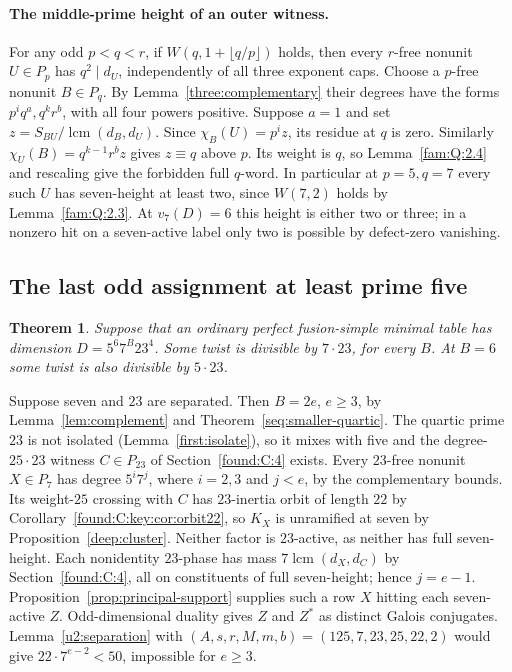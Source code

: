 \documentclass[11pt,a4paper]{article}
\numberwithin{equation}{section}
\newtheorem{theorem}{Theorem}[section]
\theoremstyle{remark}
\begin{document}
\paragraph{The middle-prime height of an outer witness.}
For any odd $p<q<r$, if $W(q,1+\lfloor q/p\rfloor)$ holds, then
every $r$-free nonunit $U\in P_p$ has $q^2\mid d_U$, independently
of all three exponent caps. Choose a $p$-free nonunit $B\in P_q$.
By Lemma~\ref{three:complementary} their degrees have the forms $p^i q^a,q^k r^b$,
with all four powers positive. Suppose $a=1$ and set
$z=S_{BU}/\operatorname{lcm}(d_B,d_U)$. Since
$\chi_B(U)=p^i z$, its residue at $q$ is zero. Similarly
$\chi_U(B)=q^{k-1}r^b z$ gives $z\equiv q$ above $p$.
Its weight is $q$, so Lemma~\ref{fam:Q:2.4} and rescaling give the
forbidden full $q$-word. In particular at $p=5,q=7$ every such
$U$ has seven-height at least two, since $W(7,2)$ holds by
Lemma~\ref{fam:Q:2.3}. At $v_7(D)=6$ this height is either two or three;
in a nonzero hit on a seven-active label only two is possible by
defect-zero vanishing.

\subsection{The last odd assignment at least prime five}\label{found:J:8}
\begin{theorem}\label{found:J:8.1}\label{found:J:key:thm:twenty-three}\label{found:C:4.1}\label{found:C:key:prop:septmix}
Suppose that an ordinary perfect fusion-simple minimal table has dimension
$D=5^6 7^B23^4$. Some twist is divisible by $7\cdot23$, for every $B$. At $B=6$ some twist is also divisible by $5\cdot23$.
\end{theorem}
Suppose seven and $23$ are separated. Then $B=2e$, $e\ge3$, by
Lemma~\ref{lem:complement} and Theorem~\ref{seq:smaller-quartic}.
The quartic prime $23$ is not isolated (Lemma~\ref{first:isolate}),
so it mixes with five and the degree-$25\cdot23$ witness
$C\in P_{23}$ of Section~\ref{found:C:4} exists.
Every $23$-free nonunit $X\in P_7$ has degree $5^i7^j$, where
$i=2,3$ and $j<e$, by the complementary bounds.
Its weight-$25$ crossing with $C$ has $23$-inertia orbit of length
$22$ by Corollary~\ref{found:C:key:cor:orbit22}, so $K_X$ is
unramified at seven by Proposition~\ref{deep:cluster}. Neither factor
is $23$-active, as neither has full seven-height. Each nonidentity
$23$-phase has mass $7\operatorname{lcm}(d_X,d_C)$ by
Section~\ref{found:C:4}, all on constituents of full seven-height;
hence $j=e-1$. Proposition~\ref{prop:principal-support} supplies such
a row $X$ hitting each seven-active $Z$. Odd-dimensional duality
gives $Z$ and $Z^*$ as distinct Galois conjugates.
Lemma~\ref{u2:separation} with $(A,s,r,M,m,b)=(125,7,23,25,22,2)$
would give $22\cdot7^{e-2}<50$, impossible for $e\ge3$.
\end{document}
